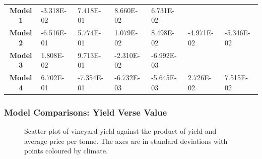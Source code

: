 \documentclass[review,12pt,authoryear]{elsarticle}
\begin{document}
\begin{linenumbers}
\begin{table}[]
{\begin{tabular}{@{}cllllll@{}}
          \textbf{Model 1} & -3.318E-02 & 7.418E-01 & 8.660E-02 & 6.731E-02 &  &  \\
          \textbf{Model 2} & -6.516E-01 & 5.774E-01 & 1.079E-02 & 8.498E-02 & -4.971E-02 & -5.346E-02 \\
          \textbf{Model 3} & 1.808E-02 & 9.713E-01 & -2.310E-02 & -6.992E-03 &  &  \\
          \textbf{Model 4} & 6.702E-01 & -7.354E-01 & -6.732E-03 & -5.645E-03 & 2.726E-02 & 7.515E-02 \\ \bottomrule
          \end{tabular}}
\end{table}
\subsubsection{Model Comparisons: Yield Verse Value}
%
\begin{figure}\label{fig:yield_vs_value}
  \caption{Scatter plot of vineyard yield against the product of yield and average price per tonne. The axes are in standard deviations with points coloured by climate.}
\end{figure}
%
\begin{figure}\label{fig:yield_vs_value_area}
  \resizebox{\textwidth}{!}{
}
\end{figure}
\end{linenumbers}
\end{document}
